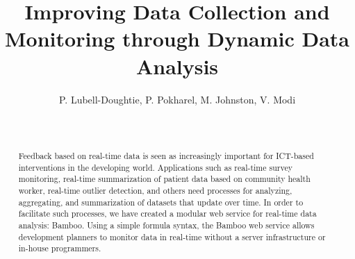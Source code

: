 \documentclass{acm_proc_article-sp}
\begin{document}
\title{Improving Data Collection and Monitoring through Dynamic Data Analysis}
\subtitle{}
%
%
%
%
%

%
\author{
%
%
\alignauthor
P. Lubell-Doughtie, P. Pokharel, M. Johnston, V. Modi\\
       \\
       \\
}

\maketitle
\begin{abstract}
Feedback based on real-time data is seen as increasingly important for ICT-based interventions in the developing world. Applications such as real-time survey monitoring, real-time summarization of patient data based on community health worker, real-time outlier detection, and others need processes for analyzing, aggregating, and summarization of datasets that update over time. In order to facilitate such processes, we have created a modular web service for real-time data analysis: Bamboo.  Using a simple formula syntax, the Bamboo web service allows development planners to monitor data in real-time without a server infrastructure or in-house programmers.
\end{abstract}
\end{document}
